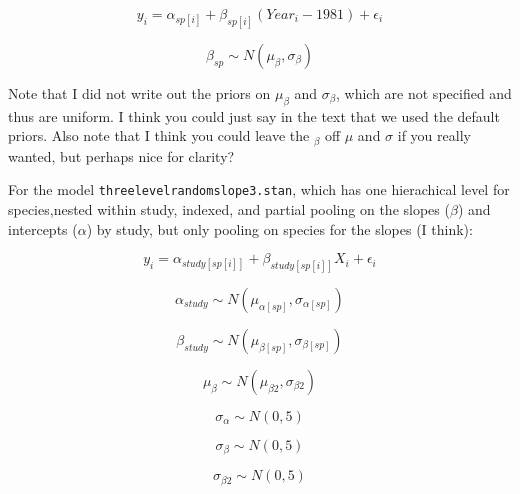 \documentclass[12pt,a4paper]{article}
\begin{document}
\begin{equation}
y_{i}=\alpha_{sp[i]}+\beta_{sp[i]}(Year_{i}-1981)+\epsilon_{i}
\end{equation}

\begin{equation}
\beta_{sp} \sim N(\mu_{\beta}, \sigma_{\beta})
\end{equation}

\vspace{2ex}

\noindent Note that I did not write out the priors on $\mu_{\beta}$ and $\sigma_{\beta}$, which are not specified and thus are uniform. I think you could just say in the text that we used the default priors. Also note that I think you could leave the $_{\beta}$ off $\mu$ and $\sigma$ if you really wanted, but perhaps nice for clarity?

\newpage

\noindent For the model \verb|threelevelrandomslope3.stan|, which has one hierachical level for species,nested within study, indexed, and partial pooling on the slopes ($\beta$) and intercepts ($\alpha$) by study, but only pooling on species for the slopes (I think):

\begin{equation}
y_{i}=\alpha_{study[sp[i]]}+\beta_{study[sp[i]]}X_{i}+\epsilon_{i}
\end{equation}

\begin{equation}
\alpha_{study} \sim N(\mu_{\alpha[sp]}, \sigma_{\alpha[sp]})
\end{equation}


\begin{equation}
\beta_{study} \sim N(\mu_{\beta[sp]}, \sigma_{\beta[sp]})
\end{equation}


\begin{equation}
\mu_{\beta} \sim N(\mu_{\beta 2}, \sigma_{\beta 2})
\end{equation}

\begin{equation}
\sigma_{\alpha} \sim N(0,5)
\end{equation}

\begin{equation}
\sigma_{\beta} \sim N(0,5)
\end{equation}


\begin{equation}
\sigma_{\beta 2}\sim N(0,5)
\end{equation}
\end{document}
